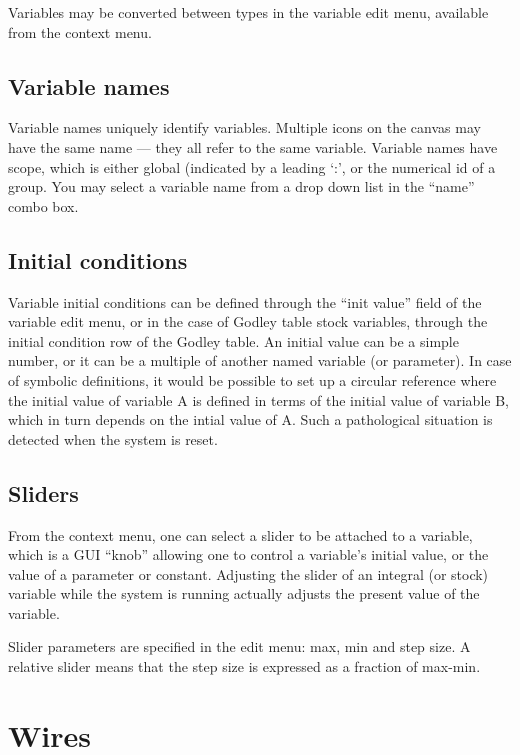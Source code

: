 Variables may be converted between types in the variable edit menu,
available from the context menu.

\subsection{Variable names}

Variable names uniquely identify variables. Multiple icons on the
canvas may have the same name --- they all refer to the same
variable. Variable names have scope, which is either global (indicated
by a leading `:', or the numerical id of a group. You may select a
variable name from a drop down list in the ``name'' combo box.

\subsection{Initial conditions}\label{var:init}

Variable initial conditions can be defined through the ``init value''
field of the variable edit menu, or in the case of Godley table stock
variables, through the initial condition row of the Godley table. An
initial value can be a simple number, or it can be a multiple of
another named variable (or parameter). In case of symbolic
definitions, it would be possible to set up a circular reference where
the initial value of variable A is defined in terms of the initial
value of variable B, which in turn depends on the intial value of
A. Such a pathological situation is detected when the system is reset.

\subsection{Sliders}

From the context menu, one can select a slider to be attached to a
variable, which is a GUI ``knob'' allowing one to control a variable's
initial value, or the value of a parameter or constant. Adjusting the
slider of an integral (or stock) variable while the system is running
actually adjusts the present value of the variable.

Slider parameters are specified in the edit menu: max, min and step
size. A relative slider means that the step size is expressed as a
fraction of max-min.

\section{Wires}

